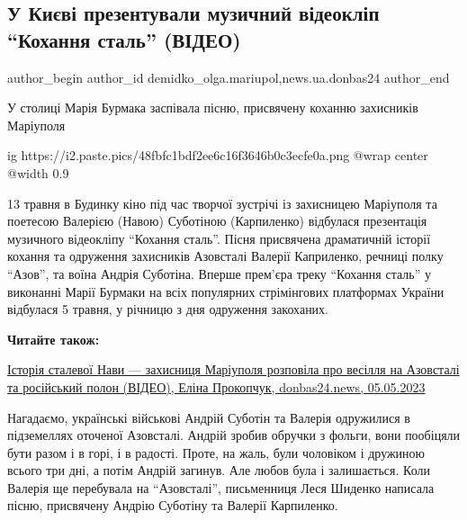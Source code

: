  
 
 
 
 
 
\subsection{У Києві презентували музичний відеокліп \enquote{Кохання сталь} (ВІДЕО)}
\label{sec:15_05_2023.stz.news.ua.donbas24.1.muzychnyj_videoklip_kohannja_stal}
 
\ifcmt
 author_begin
   author_id demidko_olga.mariupol,news.ua.donbas24
 author_end
\fi

У столиці Марія Бурмака заспівала пісню, присвячену коханню захисників
Маріуполя

\ifcmt
  ig https://i2.paste.pics/48fbfc1bdf2ee6c16f3646b0c3ecfe0a.png
  @wrap center
  @width 0.9
\fi

13 травня в Будинку кіно під час творчої зустрічі із захисницею Маріуполя та
поетесою Валерією (Навою) Суботіною (Карпиленко) відбулася презентація
музичного відеокліпу \enquote{Кохання сталь}. Пісня присвячена драматичній історії
кохання та одруження захисників Азовсталі Валерії Каприленко, речниці полку
\enquote{Азов}, та воїна Андрія Суботіна. Вперше прем'єра треку \enquote{Кохання сталь} у
виконанні Марії Бурмаки на всіх популярних стрімінгових платформах України
відбулася 5 травня, у річницю з дня одруження закоханих.

\textbf{Читайте також:} 

\href{https://donbas24.news/news/istoriya-stalevoyi-navi-zaxisnicya-mariupolya-rozpovila-pro-vesillya-na-azovstali-ta-rosiiskii-polon-video}{%
Історія сталевої Нави — захисниця Маріуполя розповіла про весілля на Азовсталі та російський полон (ВІДЕО), %
Еліна Прокопчук, donbas24.news, 05.05.2023%
}

Нагадаємо, українські військові Андрій Суботін та Валерія одружилися в
підземеллях оточеної Азовсталі. Андрій зробив обручки з фольги, вони пообіцяли
бути разом і в горі, і в радості. Проте, на жаль, були чоловіком і дружиною
всього три дні, а потім Андрій загинув. Але любов була і залишається. Коли
Валерія ще перебувала на \enquote{Азовсталі}, письменниця Леся Шиденко написала пісню,
присвячену Андрію Суботіну та Валерії Карпиленко.

